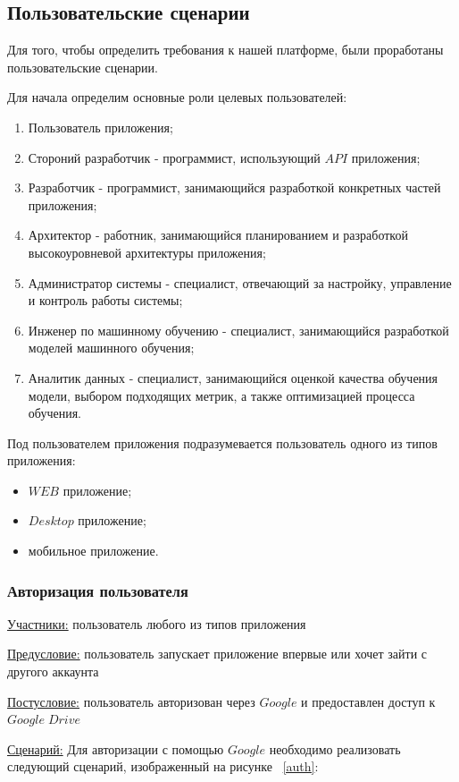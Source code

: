 \subsection{Пользовательские сценарии}
Для того, чтобы определить требования к нашей платформе, были проработаны пользовательские сценарии.

Для начала определим основные роли целевых пользователей:
\begin{enumerate}
    \item Пользователь приложения;
    \item Стороний разработчик - программист, использующий $API$ приложения;
    \item Разработчик - программист, занимающийся разработкой конкретных частей приложения;
    \item Архитектор - работник, занимающийся планированием и разработкой высокоуровневой архитектуры приложения;
    \item Администратор системы - специалист, отвечающий за настройку, управление и контроль работы системы;
    \item Инженер по машинному обучению - специалист, занимающийся разработкой моделей машинного обучения;
    \item Аналитик данных - специалист, занимающийся оценкой качества обучения модели, выбором подходящих метрик, а также оптимизацией процесса обучения.
\end{enumerate}

Под пользователем приложения подразумевается пользователь одного из типов приложения:
\begin{itemize}
    \item $WEB$ приложение;
    \item $Desktop$ приложение;
    \item мобильное приложение.
\end{itemize}

\subsubsection{Авторизация пользователя}
\underline{Участники:} пользователь любого из типов приложения

\underline{Предусловие:} пользователь запускает приложение впервые или хочет зайти с другого аккаунта

\underline{Постусловие:} пользователь авторизован через $Google$ и предоставлен доступ к $Google\;Drive$

\underline{Сценарий:}
Для авторизации с помощью $Google$ необходимо реализовать следующий сценарий, изображенный на рисунке ~\ref{auth}:

